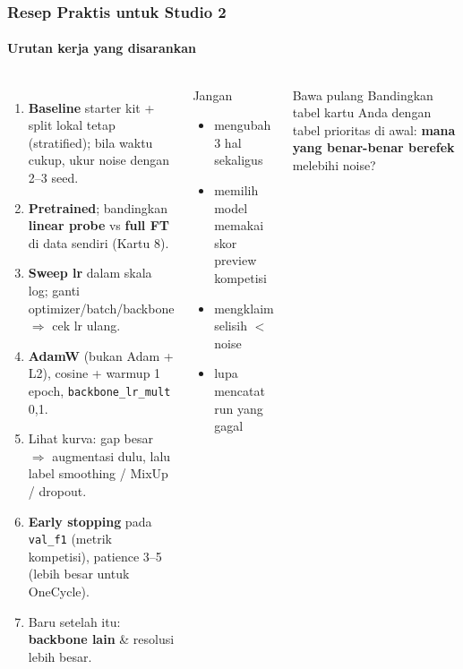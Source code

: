 \documentclass[t,aspectratio=169,xcolor={dvipsnames,table}]{beamer}
\begin{document}
\begin{frame}
    \frametitle{Resep Praktis untuk Studio 2}
    \framesubtitle{Urutan kerja yang disarankan}
    \footnotesize

    \begin{columns}[T]
        \begin{enumerate}
            \item \textbf{Baseline} starter kit + split lokal tetap (stratified); bila waktu cukup, ukur noise dengan 2--3 seed.
            \item \textbf{Pretrained}; bandingkan \textbf{linear probe} vs \textbf{full FT} di data sendiri (Kartu 8).
            \item \textbf{Sweep lr} dalam skala log; ganti optimizer/batch/backbone $\Rightarrow$ cek lr ulang.
            \item \textbf{AdamW} (bukan Adam + L2), cosine + warmup 1 epoch, \texttt{backbone\_lr\_mult} 0,1.
            \item Lihat kurva: gap besar $\Rightarrow$ augmentasi dulu, lalu label smoothing / MixUp / dropout.
            \item \textbf{Early stopping} pada \texttt{val\_f1} (metrik kompetisi), patience 3--5 (lebih besar untuk OneCycle).
            \item Baru setelah itu: \textbf{backbone lain} \& resolusi lebih besar.
        \end{enumerate}

        \begin{block}{Jangan}
            \begin{itemize}
                \item mengubah 3 hal sekaligus
                \item memilih model memakai skor preview kompetisi
                \item mengklaim selisih $<$ noise
                \item lupa mencatat run yang gagal
            \end{itemize}
        \end{block}
        \begin{exampleblock}{Bawa pulang}
            Bandingkan tabel kartu Anda dengan tabel prioritas di awal: \textbf{mana yang benar-benar berefek} melebihi noise?
        \end{exampleblock}
    \end{columns}
\end{frame}
\end{document}
